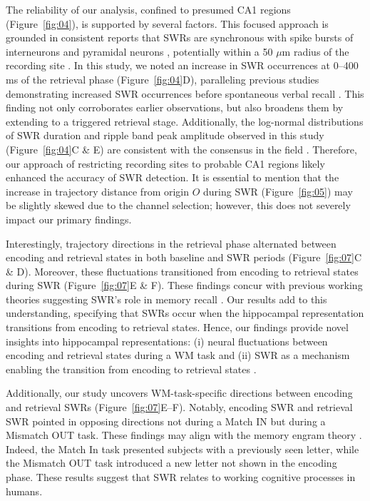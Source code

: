 \documentclass[final,3p,times,twocolumn]{elsarticle}
\begin{document}
The reliability of our analysis, confined to presumed CA1 regions (Figure~\ref{fig:04}), is supported by several factors. This focused approach is grounded in consistent reports that SWRs are synchronous with spike bursts of interneurons and pyramidal neurons \cite{buzsaki_two-stage_1989} \cite{quyen_cell_2008} \cite{royer_control_2012} \cite{hajos_input-output_2013}, potentially within a 50 $\mu$m radius of the recording site \cite{schomburg_spiking_2012}. In this study, we noted an increase in SWR occurrences at 0--400 ms of the retrieval phase (Figure~\ref{fig:04}D), paralleling previous studies demonstrating increased SWR occurrences before spontaneous verbal recall \cite{norman_hippocampal_2019} \cite{norman_hippocampal_2021}. This finding not only corroborates earlier observations, but also broadens them by extending to a triggered retrieval stage. Additionally, the log-normal distributions of SWR duration and ripple band peak amplitude observed in this study (Figure~\ref{fig:04}C & E) are consistent with the consensus in the field \cite{liu_consensus_2022}. Therefore, our approach of restricting recording sites to probable CA1 regions likely enhanced the accuracy of SWR detection. It is essential to mention that the increase in trajectory distance from origin $O$ during SWR (Figure~\ref{fig:05}) may be slightly skewed due to the channel selection; however, this does not severely impact our primary findings.

Interestingly, trajectory directions in the retrieval phase alternated between encoding and retrieval states in both baseline and SWR periods (Figure~\ref{fig:07}C \& D). Moreover, these fluctuations transitioned from encoding to retrieval states during SWR (Figure~\ref{fig:07}E \& F). These findings concur with previous working theories suggesting SWR’s role in memory recall \cite{norman_hippocampal_2019} \cite{norman_hippocampal_2021}. Our results add to this understanding, specifying that SWRs occur when the hippocampal representation transitions from encoding to retrieval states. Hence, our findings provide novel insights into hippocampal representations: (i) neural fluctuations between encoding and retrieval states during a WM task and (ii) SWR as a mechanism enabling the transition from encoding to retrieval states \cite{buzsaki_hippocampal_2015}.

Additionally, our study uncovers WM-task-specific directions between encoding and retrieval SWRs (Figure~\ref{fig:07}E--F). Notably, encoding SWR and retrieval SWR pointed in opposing directions not during a Match IN but during a Mismatch OUT task. These findings may align with the memory engram theory \cite{liu_optogenetic_2012}. Indeed, the Match In task presented subjects with a previously seen letter, while the Mismatch OUT task introduced a new letter not shown in the encoding phase. These results suggest that SWR relates to working cognitive processes in humans.
\end{document}
